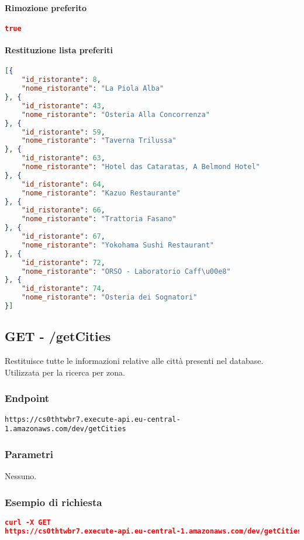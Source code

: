\paragraph{Rimozione preferito}
\begin{lstlisting}[language=json, caption={Esempio di risposta \texttt{/favorites} per la rimozione di un preferito}, captionpos=b]
true
\end{lstlisting}


\paragraph{Restituzione lista preferiti}
\begin{lstlisting}[language=json, caption={Esempio di risposta \texttt{/favorites} per la restituzione della lista dei preferiti}, captionpos=b]
[{
    "id_ristorante": 8,
    "nome_ristorante": "La Piola Alba"
}, {
    "id_ristorante": 43,
    "nome_ristorante": "Osteria Alla Concorrenza"
}, {
    "id_ristorante": 59,
    "nome_ristorante": "Taverna Trilussa"
}, {
    "id_ristorante": 63,
    "nome_ristorante": "Hotel das Cataratas, A Belmond Hotel"
}, {
    "id_ristorante": 64,
    "nome_ristorante": "Kazuo Restaurante"
}, {
    "id_ristorante": 66,
    "nome_ristorante": "Trattoria Fasano"
}, {
    "id_ristorante": 67,
    "nome_ristorante": "Yokohama Sushi Restaurant"
}, {
    "id_ristorante": 72,
    "nome_ristorante": "ORSO - Laboratorio Caff\u00e8"
}, {
    "id_ristorante": 74,
    "nome_ristorante": "Osteria dei Sognatori"
}]
\end{lstlisting}


\pagebreak


\subsection{GET - /getCities} 
Restituisce tutte le informazioni relative alle città presenti nel database. Utilizzata per la ricerca per zona. 


\subsubsection{Endpoint}
\texttt{https://cs0thtwbr7.execute-api.eu-central-1.amazonaws.com/dev/getCities}

\subsubsection{Parametri}
Nessuno.

\subsubsection{Esempio di richiesta}
\begin{lstlisting}[language=json, caption={Esempio di richiesta \texttt{/getCities}}, captionpos=b]
curl -X GET 
https://cs0thtwbr7.execute-api.eu-central-1.amazonaws.com/dev/getCities

\end{lstlisting}

